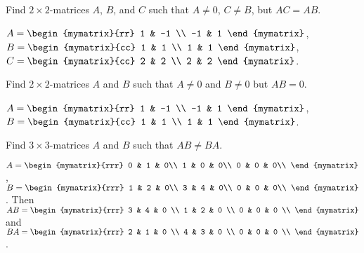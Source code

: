 \begin{enumialphparenastyle}
\begin{ex}
  Find $2\times 2$-matrices $A$, $B$, and $C$ such that
  $A\neq 0$, $C\neq B$,
  but $AC=AB$. 
  \begin{sol}
    $A = \begin{mymatrix}{rr}
      1 & -1 \\
      -1 & 1
    \end{mymatrix}$, $B = \begin{mymatrix}{cc}
      1 & 1 \\
      1 & 1
    \end{mymatrix}$, $C = \begin{mymatrix}{cc}
      2 & 2 \\
      2 & 2
    \end{mymatrix}$. 
  \end{sol}
\end{ex}

\begin{ex}
  Find $2\times 2$-matrices $A$ and $B$ such that $A \neq 0$
  and $B \neq 0$ but $AB = 0$.
  \begin{sol}
    $A = \begin{mymatrix}{rr}
      1 & -1 \\
      -1 & 1
    \end{mymatrix}$, $B = \begin{mymatrix}{cc}
      1 & 1 \\
      1 & 1
    \end{mymatrix}$. 
  \end{sol}
\end{ex}

\begin{ex}
  Find $3 \times 3$-matrices $A$ and $B$ such that $AB \neq BA$.
  \begin{sol}
    $A = \begin{mymatrix}{rrr}
      0 & 1 & 0\\
      1 & 0 & 0\\
      0 & 0 & 0\\
    \end{mymatrix}$, $B = \begin{mymatrix}{rrr}
      1 & 2 & 0\\
      3 & 4 & 0\\
      0 & 0 & 0\\
    \end{mymatrix}$. Then 
    $AB=
    \begin{mymatrix}{rrr}
      3 & 4 & 0 \\
      1 & 2 & 0 \\
      0 & 0 & 0 \\
    \end{mymatrix}$ and $BA = 
    \begin{mymatrix}{rrr}
      2 & 1 & 0 \\
      4 & 3 & 0 \\
      0 & 0 & 0 \\
    \end{mymatrix}$.
  \end{sol}
\end{ex}


\end{enumialphparenastyle}
